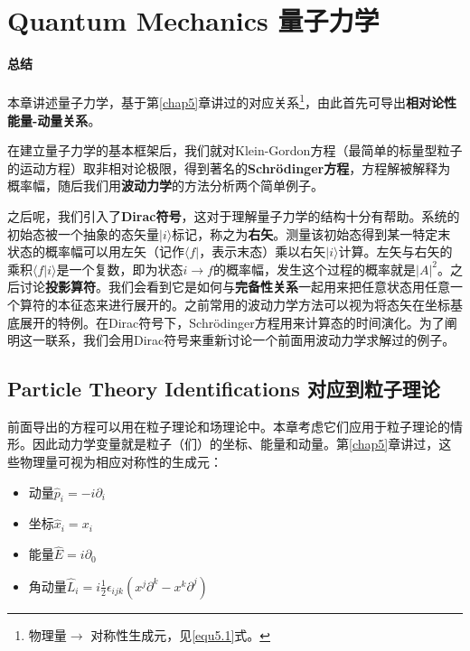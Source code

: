 
\def\pmm{\begin{pmatrix}}
\def\pmme{\end{pmatrix}}


\chapter[量子力学]{Quantum Mechanics \quad 量子力学}\label{chap8}

{\Huge\bf 总结\\ \ \\}
本章讲述量子力学，基于第\ref{chap5}章讲过的对应关系\footnote{物理量$\to$ 对称性生成元，见\eqref{equ5.1}式。}，由此首先可导出{\bf 相对论性能量-动量关系}。

在建立量子力学的基本框架后，我们就对Klein-Gordon方程（最简单的标量型粒子的运动方程）取非相对论极限，得到著名的{\bf Schrödinger方程}，方程解被解释为概率幅，随后我们用{\bf 波动力学}的方法分析两个简单例子。

之后呢，我们引入了{\bf Dirac符号}，这对于理解量子力学的结构十分有帮助。系统的初始态被一个抽象的态矢量$|i\rangle$标记，称之为{\bf 右矢}。测量该初始态得到某一特定末状态的概率幅可以用左矢（记作$\langle f|$，表示末态）乘以右矢$|i \rangle$计算。左矢与右矢的乘积$\langle f | i \rangle$是一个复数，即为状态$i \to f$的概率幅，发生这个过程的概率就是$|A|^2$。之后讨论{\bf 投影算符}。我们会看到它是如何与{\bf 完备性关系}一起用来把任意状态用任意一个算符的本征态来进行展开的。之前常用的波动力学方法可以视为将态矢在坐标基底展开的特例。在Dirac符号下，Schrödinger方程用来计算态的时间演化。为了阐明这一联系，我们会用Dirac符号来重新讨论一个前面用波动力学求解过的例子。

\section[对应到粒子理论]{Particle Theory Identifications \quad 对应到粒子理论}\label{sec8.1}
前面导出的方程可以用在粒子理论和场理论中。本章考虑它们应用于粒子理论的情形。因此动力学变量就是粒子（们）的坐标、能量和动量。第\ref{chap5}章讲过，这些物理量可视为相应对称性的生成元：
\begin{itemize}
\item 动量$\hat{p}_i=-i\partial_i$\\
\item 坐标$\hat{x}_i=x_i$\\
\item 能量$\hat{E}=i\partial_0$\\
\item 角动量$\hat{L}_i=i\frac{1}{2}\epsilon_{ijk}(x^j\partial^k-x^k\partial^j)$
\end{itemize}

